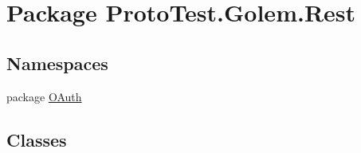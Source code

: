 \hypertarget{namespace_proto_test_1_1_golem_1_1_rest}{\section{Package Proto\-Test.\-Golem.\-Rest}
\label{namespace_proto_test_1_1_golem_1_1_rest}
}
\subsection*{Namespaces}
\begin{DoxyCompactItemize}
\item 
package \hyperlink{namespace_proto_test_1_1_golem_1_1_rest_1_1_o_auth}{O\-Auth}
\end{DoxyCompactItemize}
\subsection*{Classes}
